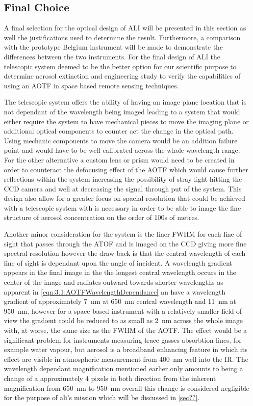 \subsection{Final Choice}

A final selection for the optical design of ALI will be presented in this section as well the justifications used to determine the result. Furthermore, a comparison with the prototype Belgium instrument will be made to demonstrate the differences between the two instruments. For the final design of ALI the telescopic system deemed to be the better option for our scientific purpose to determine aerosol extinction and engineering study to verify the capabilities of using an AOTF in space based remote sensing techniques.

The telescopic system offers the ability of having an image plane location that is not dependant of the wavelength being imaged leading to a system that would either require the system to have mechanical pieces to move the imaging plane or additional optical components to counter act the change in the optical path. Using mechanic components to move the camera would be an addition failure point and would have to be well calibrated across the whole wavelength range. For the other alternative a custom lens or prism would need to be created in order to counteract the defocusing effect of the AOTF which would cause further reflections within the system increasing the possibility of stray light hitting the CCD camera and well at decreasing the signal through put of the system. This design also allow for a greater focus on spacial resolution that could be achieved with a telescopic system with is necessary in order to be able to image the fine structure of aerosol concentration on the order of 100s of metres.

Another minor consideration for the system is the finer FWHM for each line of sight that passes through the ATOF and is imaged on the CCD giving more fine spectral resolution however the draw back is that the central wavelength of each line of sight is dependant upon the angle of incident. A wavelength gradient appears in the final image in the the longest central wavelength occurs in the center of the image and radiates outward towards shorter wavelengths as apparent in \autoref{eqn:3.1:AOTFWavelengthDependance} an have a wavelength gradient of approximately 7~nm at 650~nm central wavelength and 11~nm at 950~nm, however for a space based instrument with a relatively smaller field of view the gradient could be reduced to as small as 2~nm across the whole image with, at worse, the same size as the FWHM of the AOTF. The effect would be a significant problem for instruments measuring trace gasses absorbtion lines, for example water vapour, but aerosol is a broadband enhancing feature in which its effect are visible in atmospheric measurement from 400~nm well into the IR. The wavelength dependant magnification mentioned earlier only amounts to being a change of a approximately 4 pixels in both direction from the inherent magnification from 650~nm to 950~nm overall this change is considered negligible for the purpose of ali's mission which will be discussed in \autoref{sec??}.

